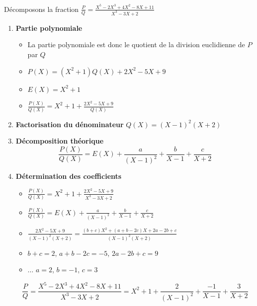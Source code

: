\begin{frame}

\begin{exemple}
Décomposons la fraction $\frac{P}{Q}= \frac{X^5-2X^3+4X^2-8X+11}{X^3-3X+2}$

\pause

\begin{enumerate}
  \item \textbf{Partie polynomiale}
  \begin{itemize}
    \item La partie polynomiale est donc le quotient de la division euclidienne de $P$ par $Q$
\pause
    \item $P(X) = (X^2+1)Q(X)+ 2X^2-5X+9$
\pause
    \item $E(X)=X^2+1$
\pause
    \item $\frac{P(X)}{Q(X)} =X^2+1 + \frac{2X^2-5X+9}{Q(X)}$
  \end{itemize}
\pause
  \item \textbf{Factorisation du dénominateur} \pause $Q(X)= (X-1)^2(X+2)$
\pause
  \item \textbf{Décomposition théorique}
\pause
$$\frac{P(X)}{Q(X)}= E(X)+ \frac{a}{(X-1)^2} + \frac{b}{X-1} + \frac{c}{X+2}$$

\end{enumerate}
\end{exemple}
\end{frame}



\begin{frame}
\begin{exemple}
\begin{enumerate}
\setcounter{enumi}{3}
  \item \textbf{Détermination des coefficients}
  \begin{itemize}
  \setlength{\itemsep}{5pt} 
    \item $\displaystyle \frac{P(X)}{Q(X)} =X^2+1 + \frac{2X^2-5X+9}{X^3-3X+2}$
    \item $\displaystyle \frac{P(X)}{Q(X)}= E(X)+ \frac{a}{(X-1)^2} + \frac{b}{X-1} + \frac{c}{X+2}$
\pause
    \item $\displaystyle \frac{2X^2-5X+9}{(X-1)^2(X+2)} = \frac{(b+c)X^2+(a+b-2c)X+2a-2b+c}{(X-1)^2(X+2)}$
\pause
    \item $b+c=2$, \quad  $a+b-2c=-5$, \quad $2a-2b+c=9$
\pause
    \item $\ldots$ $a=2$, $b=-1$, $c=3$
  \end{itemize}
\pause
{\small
$$\frac{P}{Q} = \frac{X^5-2X^3+4X^2-8X+11}{X^3-3X+2} = X^2+1 + \frac{2}{(X-1)^2} + \frac{-1}{X-1} + \frac{3}{X+2}$$
}
\end{enumerate}
\end{exemple}
\end{frame}

